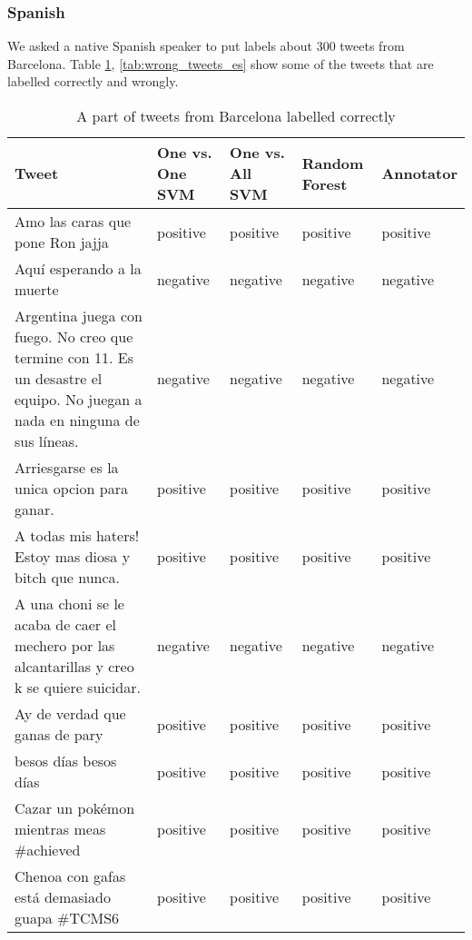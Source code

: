 \subsubsection{Spanish}
We asked a native Spanish speaker to put labels about 300 tweets from Barcelona.
Table \ref{tab:correct_tweets_es}, \ref{tab:wrong_tweets_es}  show some of the tweets that are labelled correctly and wrongly.
\begin{table}[ht]
	\caption{A part of tweets from Barcelona labelled correctly}
	\begin{tabular}{|p{5cm}|p{1.8cm}|p{1.8cm}|p{1.8cm}|p{1.8cm}|} \hline
	Tweet & One vs. One SVM &One vs. All SVM &Random Forest & Annotator\\ \hline

	Amo las caras que pone Ron jajja&positive&positive&positive&positive \\ \hline
	Aqu\'i esperando a la muerte&negative &negative &negative &negative \\ \hline
	Argentina juega con fuego. No creo que termine con 11. Es un desastre el equipo. No juegan a nada en ninguna de sus l\'ineas. &negative&negative&negative&negative\\ \hline
	Arriesgarse es la unica opcion para ganar.&positive&positive&positive&positive\\ \hline
	A todas mis haters! Estoy mas diosa y bitch que nunca.&positive&positive&positive&positive\\ \hline

	A una choni se le acaba de caer el mechero por las alcantarillas y creo k se quiere suicidar.&negative&negative&negative&negative\\ \hline
	Ay de verdad que ganas de pary&positive&positive&positive&positive\\ \hline
	besos días besos d\'ias&positive&positive&positive&positive\\ \hline
	Cazar un pok\'emon mientras meas \#achieved&positive&positive&positive&positive\\ \hline
	Chenoa con gafas est\'a demasiado guapa \#TCMS6&positive&positive&positive&positive\\ \hline

	\end{tabular}
	\label{tab:correct_tweets_es}
\end{table}


